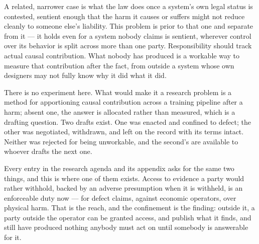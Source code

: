 A related, narrower case is what the law does once a system's own legal status is contested, sentient enough that the harm it causes or suffers might not reduce cleanly to someone else's liability. This problem is prior to that one and separate from it — it holds even for a system nobody claims is sentient, wherever control over its behavior is split across more than one party. Responsibility should track actual causal contribution. What nobody has produced is a workable way to measure that contribution after the fact, from outside a system whose own designers may not fully know why it did what it did.

There is no experiment here. What would make it a research problem is a method for apportioning causal contribution across a training pipeline after a harm; absent one, the answer is allocated rather than measured, which is a drafting question. Two drafts exist. One was enacted and confined to defect; the other was negotiated, withdrawn, and left on the record with its terms intact. Neither was rejected for being unworkable, and the second's are available to whoever drafts the next one.

Every entry in the research agenda and its appendix asks for the same two things, and this is where one of them exists. Access to evidence a party would rather withhold, backed by an adverse presumption when it is withheld, is an enforceable duty now — for defect claims, against economic operators, over physical harm. That is the reach, and the confinement is the finding: outside it, a party outside the operator can be granted access, and publish what it finds, and still have produced nothing anybody must act on until somebody is answerable for it.
